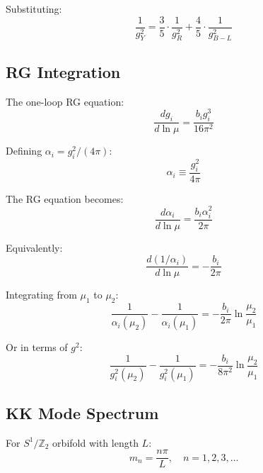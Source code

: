 \documentclass[11pt,a4paper]{article}
\begin{document}
Substituting:
\begin{equation}
\label{eq:matching-subst}
\frac{1}{g_Y^2} = \frac{3}{5} \cdot \frac{1}{g_R^2} + \frac{4}{5} \cdot \frac{1}{g_{B-L}^2}
\end{equation}

\subsection{RG Integration}
\label{subsec:rg-integration}

The one-loop RG equation:
\begin{equation}
\label{eq:rg-ode}
\frac{dg_i}{d\ln\mu} = \frac{b_i g_i^3}{16\pi^2}
\end{equation}

Defining $\alpha_i = g_i^2/(4\pi)$:
\begin{equation}
\label{eq:alpha-def}
\alpha_i \equiv \frac{g_i^2}{4\pi}
\end{equation}

The RG equation becomes:
\begin{equation}
\label{eq:rg-alpha}
\frac{d\alpha_i}{d\ln\mu} = \frac{b_i \alpha_i^2}{2\pi}
\end{equation}

Equivalently:
\begin{equation}
\label{eq:rg-inverse-alpha}
\frac{d(1/\alpha_i)}{d\ln\mu} = -\frac{b_i}{2\pi}
\end{equation}

Integrating from $\mu_1$ to $\mu_2$:
\begin{equation}
\label{eq:rg-integrated}
\frac{1}{\alpha_i(\mu_2)} - \frac{1}{\alpha_i(\mu_1)} = -\frac{b_i}{2\pi}\ln\frac{\mu_2}{\mu_1}
\end{equation}

Or in terms of $g^2$:
\begin{equation}
\label{eq:rg-g2-integrated}
\frac{1}{g_i^2(\mu_2)} - \frac{1}{g_i^2(\mu_1)} = -\frac{b_i}{8\pi^2}\ln\frac{\mu_2}{\mu_1}
\end{equation}

\subsection{KK Mode Spectrum}
\label{subsec:kk-spectrum}

For $S^1/\mathbb{Z}_2$ orbifold with length $L$:
\begin{equation}
\label{eq:kk-mass}
m_n = \frac{n\pi}{L}, \quad n = 1, 2, 3, \ldots
\end{equation}
\end{document}
